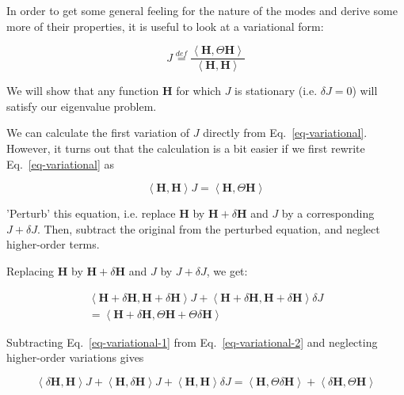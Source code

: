 \pagebreak


In order to get some general feeling for the nature of the modes and derive some more of their properties, it is useful to look at a variational form:

\begin{equation}
J \stackrel{def}{=} \frac{\left\langle {\mathbf H} , \Theta {\mathbf H}\right\rangle}{\left\langle {\mathbf H} , {\mathbf H}\right\rangle} \label{eq-variational}
\end{equation}  

We will show that any function ${\mathbf H}$ for which $J$ is stationary (i.e. $\delta J=0$) will satisfy our eigenvalue problem.

We can calculate the first variation of $J$ directly from Eq.~\ref{eq-variational}. However, it turns out that the calculation is a bit easier if we first rewrite Eq.~\ref{eq-variational} as

\begin{equation}
\left\langle {\mathbf H},{\mathbf H} \right\rangle J = \left\langle {\mathbf H},\Theta {\mathbf H} \right\rangle \label{eq-variational-1}
\end{equation} 

\begin{cue}
'Perturb' this equation, i.e. replace ${\mathbf H}$ by ${\mathbf H} + \delta {\mathbf H}$ and $J$ by a corresponding $J+ \delta J$. Then, subtract the original from the perturbed equation, and neglect higher-order terms.  
\end{cue}

Replacing ${\mathbf H}$ by ${\mathbf H} + \delta {\mathbf H}$ and $J$ by $J+ \delta J$, we get:

\begin{align}
\left\langle {\mathbf H + \delta {\mathbf H}},{\mathbf H}+\delta {\mathbf H} \right\rangle J + \left\langle {\mathbf H}+\delta {\mathbf H},{\mathbf H+\delta {\mathbf H}} \right\rangle \delta  J \nonumber  \\
  = \left\langle {\mathbf H}+\delta {\mathbf H},\Theta {\mathbf H} + \Theta \delta {\mathbf H} \right\rangle
\label{eq-variational-2}
\end{align} 

Subtracting Eq.~\ref{eq-variational-1} from Eq.~\ref{eq-variational-2} and neglecting higher-order variations gives

\begin{equation}
\left\langle \delta {\mathbf H},{\mathbf H} \right\rangle J + \left\langle {\mathbf H},\delta {\mathbf H} \right\rangle J + \left\langle {\mathbf H}, {\mathbf H} \right\rangle \delta J = \left\langle {\mathbf H},\Theta \delta {\mathbf H} \right\rangle + \left\langle \delta {\mathbf H},\Theta {\mathbf H} \right\rangle \label{eq-variational-3}
\end{equation} 


